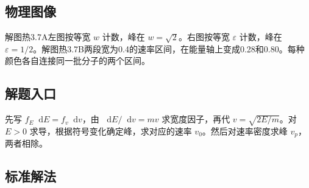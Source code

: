 \documentclass[UTF8,fontset=fandol,a4paper,11pt]{ctexart}
\newcommand{\dd}{\mathop{}\!\mathrm{d}}
\begin{document}
\subsection*{物理图像}

解图热3.7A左图按等宽 $w$ 计数，峰在 $w=\sqrt2$。右图按等宽 $\varepsilon$ 计数，峰在 $\varepsilon=1/2$。解图热3.7B两段宽为0.4的速率区间，在能量轴上变成0.28和0.80。每种颜色各自连接同一批分子的两个区间。



\subsection*{解题入口}

先写 $f_E\dd E=f_v\dd v$，由 $\dd E/\dd v=mv$ 求宽度因子，再代 $v=\sqrt{2E/m}$。对 $E>0$ 求导，根据符号变化确定峰，求对应的速率 $v_0$。然后对速率密度求峰 $v_p$，两者相除。




\subsection*{标准解法}
\end{document}
